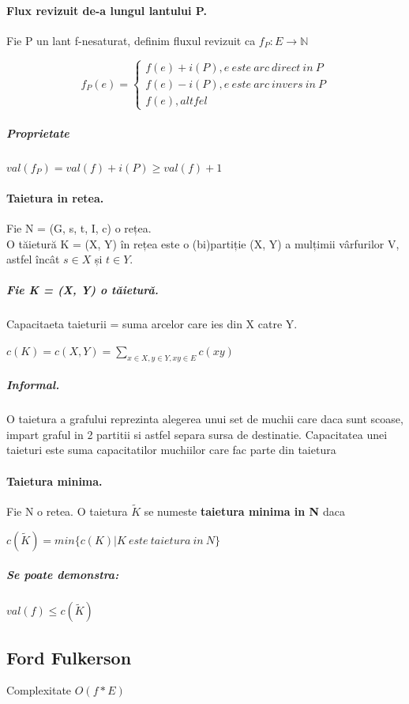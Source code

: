 \documentclass{article}
\begin{document}
\paragraph*{Flux revizuit de-a lungul lantului P.} Fie P un lant f-nesaturat, definim fluxul revizuit ca $f_P : E \to \mathbb{N}$
\begin{center}
    \[
        f_P(e) = \left\{
        \begin{array}{ll}
            f(e) + i(P), e \ este \ arc \ direct \ in \ P \\
            f(e) - i(P), e \ este \ arc \ invers \ in \ P \\
            f(e), altfel
        \end{array}
        \right.
    \]
\end{center}
\subparagraph*{Proprietate} $val(f_P) = val(f) + i(P) \geq val(f) + 1$

\paragraph*{Taietura in retea.} Fie N = (G, {s}, {t}, I, c) o rețea.\\
O tăietură K = (X, Y) în rețea este o (bi)partiție (X, Y) a mulțimii vârfurilor V, astfel încât $s \in X$ și $t \in Y$.
\subparagraph*{Fie K = (X, Y) o tăietură.} Capacitaeta taieturii = suma arcelor care ies din X catre Y.
\begin{center}
    $c(K) = c(X, Y) = \sum_{x \in X, y \in Y, xy \in E}c(xy)$
\end{center}

\subparagraph*{Informal.} O taietura a grafului reprezinta alegerea unui set de muchii care daca sunt scoase, impart graful in 2 partitii si astfel separa sursa de destinatie. Capacitatea unei taieturi este suma capacitatilor muchiilor care fac parte din taietura

\paragraph*{Taietura minima.} Fie N o retea. O taietura $\widetilde{K}$ se numeste \textbf{taietura minima in N} daca
\begin{center}
    $c(\widetilde{K}) = min \{c(K) | K \ este \ taietura \ in \ N\}$
\end{center}
\subparagraph*{Se poate demonstra: } $val(f) \leq c(\widetilde{K})$

\subsection*{Ford Fulkerson} Complexitate $O(f*E)$
\end{document}
